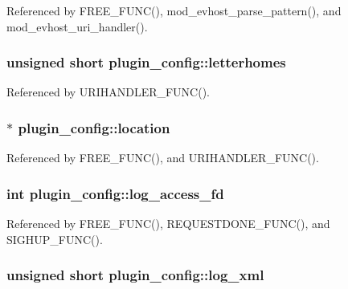Referenced by F\-R\-E\-E\-\_\-\-F\-U\-N\-C(), mod\-\_\-evhost\-\_\-parse\-\_\-pattern(), and mod\-\_\-evhost\-\_\-uri\-\_\-handler().

\hypertarget{structplugin__config_af2ebccceca2472128a4b4b1020061623}{
\subsubsection[{letterhomes}]{\setlength{\rightskip}{0pt plus 5cm}unsigned short plugin\-\_\-config\-::letterhomes}}\label{structplugin__config_af2ebccceca2472128a4b4b1020061623}


Referenced by U\-R\-I\-H\-A\-N\-D\-L\-E\-R\-\_\-\-F\-U\-N\-C().

\hypertarget{structplugin__config_af3b49b07eec2b3e97c1bf62438f09420}{
\subsubsection[{location}]{$\ast$ plugin\-\_\-config\-::location}}\label{structplugin__config_af3b49b07eec2b3e97c1bf62438f09420}


Referenced by F\-R\-E\-E\-\_\-\-F\-U\-N\-C(), and U\-R\-I\-H\-A\-N\-D\-L\-E\-R\-\_\-\-F\-U\-N\-C().

\hypertarget{structplugin__config_ac2cfe959ecfdb9e94aa13fb163c58e85}{
\subsubsection[{log\-\_\-access\-\_\-fd}]{\setlength{\rightskip}{0pt plus 5cm}int plugin\-\_\-config\-::log\-\_\-access\-\_\-fd}}\label{structplugin__config_ac2cfe959ecfdb9e94aa13fb163c58e85}


Referenced by F\-R\-E\-E\-\_\-\-F\-U\-N\-C(), R\-E\-Q\-U\-E\-S\-T\-D\-O\-N\-E\-\_\-\-F\-U\-N\-C(), and S\-I\-G\-H\-U\-P\-\_\-\-F\-U\-N\-C().

\hypertarget{structplugin__config_ad23b6f47f9027b70aafea3545f0bca07}{
\subsubsection[{log\-\_\-xml}]{\setlength{\rightskip}{0pt plus 5cm}unsigned short plugin\-\_\-config\-::log\-\_\-xml}}\label{structplugin__config_ad23b6f47f9027b70aafea3545f0bca07}


